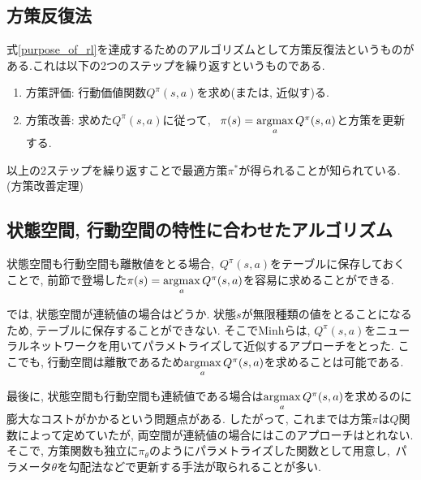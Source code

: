 \documentclass{jsarticle}
\newcommand{\argmax}{\mathop{\rm argmax}\limits}
\begin{document}
\subsection{方策反復法}
式\eqref{purpose_of_rl}を達成するためのアルゴリズムとして方策反復法というものがある.これは以下の2つのステップを繰り返すというものである.
\begin{enumerate}
	\item 方策評価: 行動価値関数$Q^{\pi}(s,a)$を求め(または, 近似す)る.
	\item 方策改善: 求めた$Q^{\pi}(s,a)$に従って, ~$\pi(s)=\argmax_aQ^{\pi}(s,a)$と方策を更新する.
\end{enumerate}
以上の2ステップを繰り返すことで最適方策$\pi^{*}$が得られることが知られている.(方策改善定理)

\subsection{状態空間, 行動空間の特性に合わせたアルゴリズム}
状態空間も行動空間も離散値をとる場合,~$Q^{\pi}(s,a)$をテーブルに保存しておくことで, 前節で登場した$\pi(s)=\argmax_aQ^{\pi}(s,a)$を容易に求めることができる.\par
では, 状態空間が連続値の場合はどうか. 状態$s$が無限種類の値をとることになるため, テーブルに保存することができない. そこでMinhら\cite{DQN}は, $Q^{\pi}(s,a)$をニューラルネットワークを用いてパラメトライズして近似するアプローチをとった. ここでも, 行動空間は離散であるため$\argmax_aQ^{\pi}(s,a)$を求めることは可能である.\par
最後に, 状態空間も行動空間も連続値である場合は$\argmax_aQ^{\pi}(s,a)$を求めるのに膨大なコストがかかるという問題点がある. したがって, これまでは方策$\pi$は$Q$関数によって定めていたが, 両空間が連続値の場合にはこのアプローチはとれない. そこで, 方策関数も独立に$\pi_{\theta}$のようにパラメトライズした関数として用意し,~パラメータ$\theta$を勾配法などで更新する手法が取られることが多い.
\end{document}
